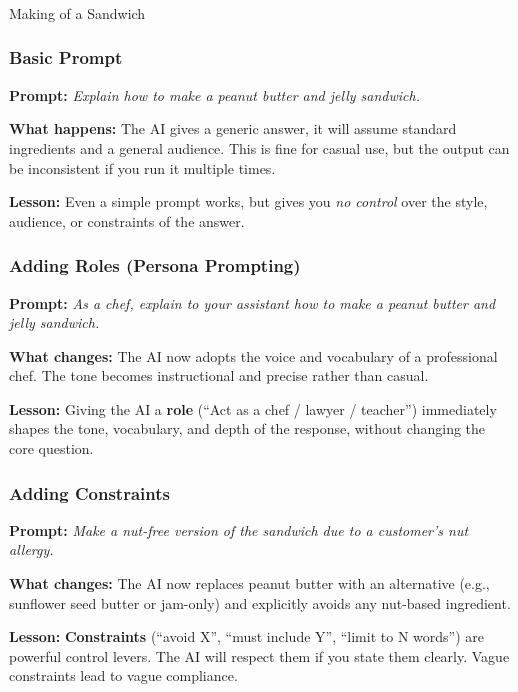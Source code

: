 \begin{frame}[fragile]\frametitle{}
\begin{center}
{\Large Making of a Sandwich}
\end{center}
\end{frame}


\begin{frame}[fragile]\frametitle{Basic Prompt}

\textbf{Prompt:} \emph{Explain how to make a peanut butter and jelly sandwich.}

\medskip
\textbf{What happens:} The AI gives a generic answer, it will assume standard ingredients and a general audience. This is fine for casual use, but the output can be inconsistent if you run it multiple times.

\medskip
\textbf{Lesson:} Even a simple prompt works, but gives you \emph{no control} over the style, audience, or constraints of the answer.

\end{frame}

\begin{frame}[fragile]\frametitle{Adding Roles (Persona Prompting)}

\textbf{Prompt:} \emph{As a chef, explain to your assistant how to make a peanut butter and jelly sandwich.}

\medskip
\textbf{What changes:} The AI now adopts the voice and vocabulary of a professional chef. The tone becomes instructional and precise rather than casual.

\medskip
\textbf{Lesson:} Giving the AI a \textbf{role} (``Act as a chef / lawyer / teacher'') immediately shapes the tone, vocabulary, and depth of the response, without changing the core question.

\end{frame}

\begin{frame}[fragile]\frametitle{Adding Constraints}

\textbf{Prompt:} \emph{Make a nut-free version of the sandwich due to a customer's nut allergy.}

\medskip
\textbf{What changes:} The AI now replaces peanut butter with an alternative (e.g., sunflower seed butter or jam-only) and explicitly avoids any nut-based ingredient.

\medskip
\textbf{Lesson:} \textbf{Constraints} (``avoid X'', ``must include Y'', ``limit to N words'') are powerful control levers. The AI will respect them if you state them clearly. Vague constraints lead to vague compliance.

\end{frame}


